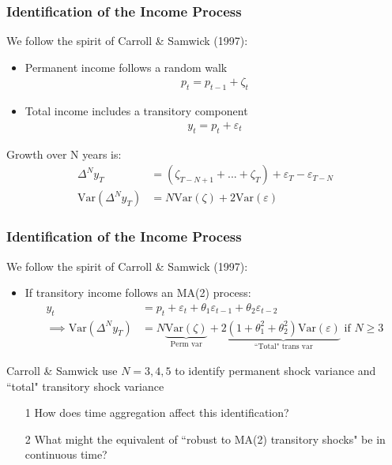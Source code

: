 \documentclass{beamer}
\begin{document}
{
	\frametitle{Identification of the Income Process}
	We follow the spirit of Carroll \& Samwick (1997):\\
	\begin{itemize}
		\item Permanent income follows a random walk
		\begin{align*}
			p_t = p_{t-1} + \zeta_t
		\end{align*}
		\item Total income includes a transitory component
		\begin{align*}
			y_t = p_t +\varepsilon_t
		\end{align*}
	\end{itemize}
	Growth over N years is:
	\begin{align*}
	\Delta^N y_T &=  (\zeta_{T-N+1} + ... +\zeta_T) + \varepsilon_T - \varepsilon_{T-N} \\
	\mathrm{Var}(\Delta^N y_T) &= N\mathrm{Var}(\zeta) + 2\mathrm{Var}(\varepsilon)
	\end{align*}
}
\frame
{
	\frametitle{Identification of the Income Process}
	We follow the spirit of Carroll \& Samwick (1997):\\
	\begin{itemize}
		\item If transitory income follows an MA(2) process:
		\begin{align*}
			y_t &= p_t + \varepsilon_t + \theta_1 \varepsilon_{t-1} +\theta_2 \varepsilon_{t-2} \\
			\implies \mathrm{Var}(\Delta^N y_T) &= N\underbrace{\mathrm{Var}(\zeta)}_{\text{Perm var}} + 2\underbrace{(1+\theta_1^2+\theta_2^2)\mathrm{Var}(\varepsilon)}_{\text{``Total" trans var}} \text{ if } N\geq 3
		\end{align*}
	\end{itemize}
	Carroll \& Samwick use $N=3,4,5$ to identify permanent shock variance and ``total" transitory shock variance
	\bigskip
	\pause
	\begin{itemize}
		\item[1] How does time aggregation affect this identification?
		\item[2] What might the equivalent of ``robust to MA(2) transitory shocks" be in continuous time?
	\end{itemize}
}
\frame
\end{document}
